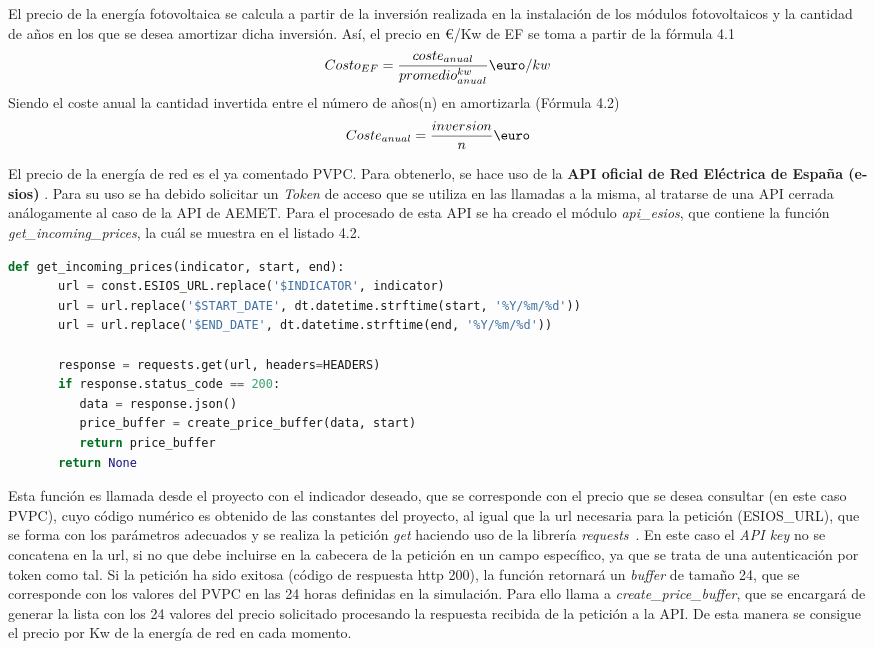 	El precio de la energía fotovoltaica se calcula a partir de la inversión realizada en la instalación de los módulos fotovoltaicos y la cantidad de años en los que se desea amortizar dicha inversión. Así, el precio en €/Kw de EF se toma a partir de la fórmula 4.1
	\begin{equation}\label{Costo_EF}
	Costo_{EF} = \frac{coste_{anual}}{promedio^{kw}_{anual}} \textup{\euro}/kw
	\end{equation}
	Siendo el coste anual la cantidad invertida entre el número de años(n) en amortizarla (Fórmula 4.2)
	\begin{equation}\label{Inversion_EF}
	Coste_{anual} = \frac{inversion}{n} \textup{\euro}
	\end{equation}

	
	El precio de la energía de red es el ya comentado PVPC. Para obtenerlo, se hace uso de la \textbf{API oficial de Red Eléctrica de España (e-sios)} \cite{Ree}. Para su uso se ha debido solicitar un \textit{Token} de acceso que se utiliza en las llamadas a la misma, al tratarse de una API cerrada análogamente al caso de la API de AEMET. Para el procesado de esta API se ha creado el módulo \textit{api\_esios}, que contiene la función \textit{get\_incoming\_prices}, la cuál se muestra en el listado 4.2.
	
	\begin{lstlisting}[language=Python,float=ht,caption={Función para obtener los valores del precio eléctrico}]
	def get_incoming_prices(indicator, start, end):
	   url = const.ESIOS_URL.replace('$INDICATOR', indicator)
	   url = url.replace('$START_DATE', dt.datetime.strftime(start, '%Y/%m/%d'))
	   url = url.replace('$END_DATE', dt.datetime.strftime(end, '%Y/%m/%d'))
	
	   response = requests.get(url, headers=HEADERS)
	   if response.status_code == 200:
	      data = response.json()
	      price_buffer = create_price_buffer(data, start)
	      return price_buffer
	   return None
	\end{lstlisting}
	
	Esta función es llamada desde el proyecto con el indicador deseado, que se corresponde con el precio que se desea consultar (en este caso PVPC), cuyo código numérico es obtenido de las constantes del proyecto, al igual que la url necesaria para la petición (ESIOS\_URL), que se forma con los parámetros adecuados y se realiza la petición \textit{get} haciendo uso de la librería \textit{requests}~\cite{Kenn11}. En este caso el \textit{API key} no se concatena en la url, si no que debe incluirse en la cabecera de la petición en un campo específico, ya que se trata de una autenticación por token como tal. Si la petición ha sido exitosa (código de respuesta http 200), la función retornará un \textit{buffer} de tamaño 24, que se corresponde con los valores del PVPC en las 24 horas definidas en la simulación. Para ello llama a \textit{create\_price\_buffer}, que se encargará de generar la lista con los 24 valores del precio solicitado procesando la respuesta recibida de la petición a la API.
	De esta manera se consigue el precio por Kw de la energía de red en cada momento.
	

